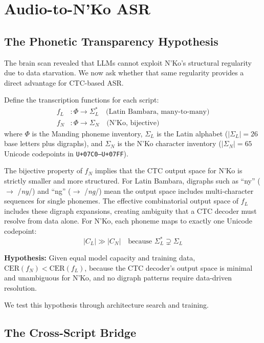 \documentclass[11pt]{article}
\begin{document}
\section{Audio-to-N'Ko ASR}

\subsection{The Phonetic Transparency Hypothesis}

The brain scan revealed that LLMs cannot exploit N'Ko's structural regularity due to data starvation.
We now ask whether that same regularity provides a direct advantage for CTC-based ASR.

Define the transcription functions for each script:
\begin{align}
f_L &: \Phi \to \Sigma_L^* \quad \text{(Latin Bambara, many-to-many)} \\
f_N &: \Phi \to \Sigma_N \quad \text{(N'Ko, bijective)}
\end{align}
where $\Phi$ is the Manding phoneme inventory, $\Sigma_L$ is the Latin alphabet ($|\Sigma_L| = 26$ base letters plus digraphs), and $\Sigma_N$ is the N'Ko character inventory ($|\Sigma_N| = 65$ Unicode codepoints in \texttt{U+07C0--U+07FF}).

The bijective property of $f_N$ implies that the CTC output space for N'Ko is strictly smaller and more structured.
For Latin Bambara, digraphs such as ``ny'' ($\to$ /\textit{ny}/) and ``ng'' ($\to$ /\textit{ng}/) mean the output space includes multi-character sequences for single phonemes.
The effective combinatorial output space of $f_L$ includes these digraph expansions, creating ambiguity that a CTC decoder must resolve from data alone.
For N'Ko, each phoneme maps to exactly one Unicode codepoint:
\begin{equation}
|C_L| \gg |C_N| \quad \text{because } \Sigma_L^* \supsetneq \Sigma_L
\end{equation}

\textbf{Hypothesis:} Given equal model capacity and training data, $\text{CER}(f_N) < \text{CER}(f_L)$, because the CTC decoder's output space is minimal and unambiguous for N'Ko, and no digraph patterns require data-driven resolution.

We test this hypothesis through architecture search and training.

\subsection{The Cross-Script Bridge}
\end{document}
